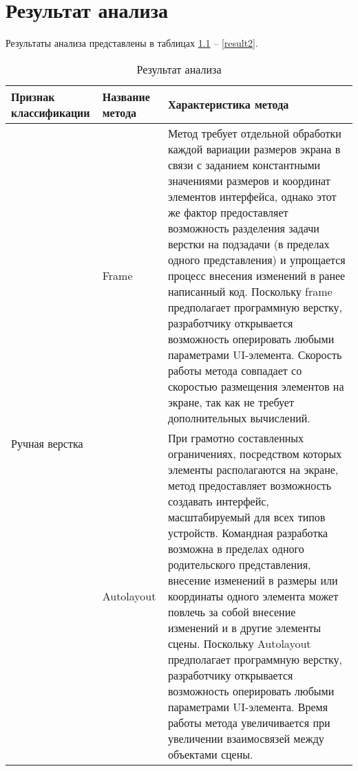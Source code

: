\chapter{Результат анализа}

Результаты анализа представлены в таблицах \ref{result} -- \ref{result2}.

\begin{table}[H]
	\centering
	\caption{Результат анализа}
	\label{result}
	\begin{tabular}{|p{3.3cm}|p{2.7cm}|p{9.2cm}|}
		\hline
		\textbf{Признак классификации} & \textbf{Название метода} & \textbf{Характеристика метода} \\
		\hline
		\multirow{2}{2.9cm}{Ручная верстка} & 
		Frame & 
		Метод требует отдельной обработки каждой вариации размеров экрана в связи с заданием константными значениями размеров и 
		координат элементов интерфейса, однако этот же фактор предоставляет возможность разделения задачи верстки на подзадачи (в 
		пределах одного представления) и упрощается процесс внесения изменений в ранее написанный код. 
		Поскольку frame предполагает программную верстку, разработчику открывается возможность оперировать любыми параметрами UI-элемента. 
		Скорость работы метода совпадает со скоростью размещения элементов на экране, так как не требует дополнительных вычислений.\\
		\hline
		
		\multirow{2}{2.9cm}{Автомати- верстка} & 
		Autolayout & 
		При грамотно составленных ограничениях, посредством которых элементы располагаются на экране, метод предоставляет 
		возможность создавать интерфейс, масштабируемый для всех типов устройств. 
		Командная разработка возможна в пределах одного родительского представления, внесение изменений в размеры или координаты одного элемента может повлечь за собой внесение 
		изменений и в другие элементы сцены. 
		Поскольку Autolayout предполагает программную верстку, разработчику открывается возможность оперировать любыми параметрами UI-элемента. 
		Время работы метода увеличивается при увеличении взаимосвязей между объектами сцены.\\
		\hline
	\end{tabular}
\end{table}

